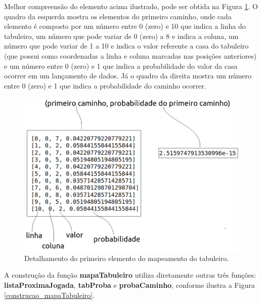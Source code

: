 \documentclass[12pt]{article}
\begin{document}
%

Melhor compreensão do elemento acima ilustrado, pode ser obtida na Figura \ref{explicacao_primeiro_elemento_mapeado}. O quadro da esquerda mostra os elementos do primeiro caminho, onde cada elemento é composto por um número entre 0 (zero) e 10 que indica a linha do tabuleiro, um número que pode variar de 0 (zero) a 8 e indica a coluna, um número que pode variar de 1 a 10 e indica o valor referente a casa do tabuleiro (que possui como coordenadas a linha e coluna marcadas nas posições anteriores) e um número entre 0 (zero) e 1 que indica a probabilidade do valor da casa ocorrer em um lançamento de dados. Já o quadro da direita mostra um número entre 0 (zero) e 1 que indica a probabilidade do caminho ocorrer.

\begin{figure}[ht]
	\centering
	\includegraphics[width=0.8\linewidth]{img/explicacao_primeiro_elemento_mapeado.png}
	\caption{Detalhamento do primeiro elemento do mapeamento do tabuleiro.}
	\label{explicacao_primeiro_elemento_mapeado}
\end{figure}

A construção da função \textbf{mapaTabuleiro} utiliza diretamente outras três funções: \textbf{listaProximaJogada}, \textbf{tabProba} e \textbf{probaCaminho}, conforme ilustra a Figura \ref{construcao_mapaTabuleiro}.
\end{document}
